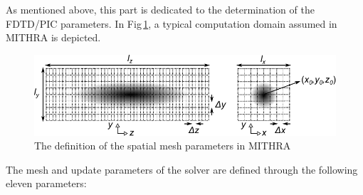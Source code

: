 As mentioned above, this part is dedicated to the determination of the FDTD/PIC parameters.
%
In Fig\,\ref{RefcardFig1}, a typical computation domain assumed in MITHRA is depicted.
%
\begin{figure}
\centering
\includegraphics[width=5.0in]{./MITHRA_REFCARD/Fig1.pdf}
\caption{The definition of the spatial mesh parameters in MITHRA}
\label{RefcardFig1}
\end{figure}
%
The mesh and update parameters of the solver are defined through the following eleven parameters:
%
